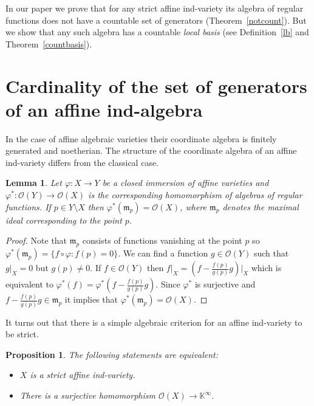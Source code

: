 \documentclass[a4paper,draft,reqno,12pt]{amsart}
\newtheorem{proposition}{Proposition}
\newtheorem{lemma}{Lemma}
\theoremstyle{definition}
\theoremstyle{remark}
\def\BK{{\mathbb K}}
\def\BK{{\mathbb K}}
\def\mf{\mathfrak{m}}
\begin{document}
In our paper we prove that for any strict affine ind-variety its algebra of regular functions does not have a countable set of generators (Theorem~\ref{notcount}). But we show that any such algebra has a countable \emph{local basis} (see Definition~\ref{lb} and Theorem~\ref{countbasis}).




\section{Cardinality of the set of generators of an affine ind-algebra}

In the case of affine algebraic varieties their coordinate algebra is finitely generated and noetherian. The structure of the coordinate algebra of an affine ind-variety differs from the classical case.

\begin{lemma}\label{points}
Let $\varphi: X \to Y$ be a closed immersion of affine varieties and $\varphi^{*}: \mathcal{O}(Y) \to \mathcal{O}(X)$ is the corresponding homomorphism of algebras of regular functions. If $p \in Y \setminus X$ then $\varphi^{*}(\mf_{p}) = \mathcal{O}(X)$, where $\mf_{p}$ denotes the maximal ideal corresponding to the point $p$.
\end{lemma}
\begin{proof}
    Note that $\mf_{p}$ consists of functions vanishing at the point $p$ so $\varphi^{*}(\mf_{p}) = \{f \circ \varphi: f(p) = 0\}$. We can find a function $g \in \mathcal{O}(Y)$ such that $g{\big|}_X = 0$ but $g(p) \neq 0$. If $f \in \mathcal{O}(Y)$ then $f{\big|}_X = (f - \frac{f(p)}{g(p)}g){\big|}_X$ which is equivalent to $\varphi^{*}(f) = \varphi^{*}(f - \frac{f(p)}{g(p)}g)$. Since $\varphi^{*}$ is surjective and $f - \frac{f(p)}{g(p)}g \in \mf_{p}$ it implies that $\varphi^{*}(\mf_{p}) = \mathcal{O}(X)$.
    
\end{proof}

It turns out that there is a simple algebraic criterion for an affine ind-variety to be strict.

\begin{proposition}\label{strict}
    The following statements are equivalent:
    
    \begin{itemize}
        \item[a) ] $X$ is a strict affine ind-variety.
        \item[b) ] There is a surjective homomorphism $\mathcal{O}(X) \to \BK^{\infty}$.
    \end{itemize}
\end{proposition}
\end{document}
